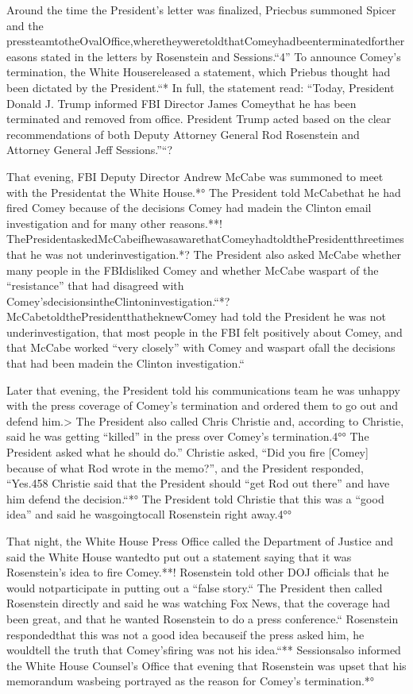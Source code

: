 {Around the time the President’s letter was finalized, Priecbus summoned Spicer and the pressteamtotheOvalOffice,wheretheyweretoldthatComeyhadbeenterminatedforthereasons stated in the letters by Rosenstein and Sessions.“4” To announce Comey’s termination, the White Housereleased a statement, which Priebus thought had been dictated by the President.“* In full, the statement read: “Today, President Donald J. Trump informed FBI Director James Comeythat he has been terminated and removed from office. President Trump acted based on the clear recommendations of both Deputy Attorney General Rod Rosenstein and Attorney General Jeff Sessions.”“?

That evening, FBI Deputy Director Andrew McCabe was summoned to meet with the Presidentat the White House.*° The President told McCabethat he had fired Comey because of the decisions Comey had madein the Clinton email investigation and for many other reasons.**! ThePresidentaskedMcCabeifhewasawarethatComeyhadtoldthePresidentthreetimesthat he was not underinvestigation.*? The President also asked McCabe whether many people in the FBIdisliked Comey and whether McCabe waspart of the “resistance” that had disagreed with Comey’sdecisionsintheClintoninvestigation.“*? McCabetoldthePresidentthatheknewComey had told the President he was not underinvestigation, that most people in the FBI felt positively about Comey, and that McCabe worked “very closely” with Comey and waspart ofall the decisions that had been madein the Clinton investigation.“

Later that evening, the President told his communications team he was unhappy with the press coverage of Comey’s termination and ordered them to go out and defend him.> The President also called Chris Christie and, according to Christie, said he was getting “killed” in the press over Comey’s termination.4°° The President asked what he should do.” Christie asked, “Did you fire [Comey] because of what Rod wrote in the memo?”, and the President responded, “Yes.458 Christie said that the President should “get Rod out there” and have him defend the decision.“*° The President told Christie that this was a “good idea” and said he wasgoingtocall Rosenstein right away.4°°

That night, the White House Press Office called the Department of Justice and said the White House wantedto put out a statement saying that it was Rosenstein’s idea to fire Comey.**! Rosenstein told other DOJ officials that he would notparticipate in putting out a “false story.“ The President then called Rosenstein directly and said he was watching Fox News, that the coverage had been great, and that he wanted Rosenstein to do a press conference.“ Rosenstein respondedthat this was not a good idea becauseif the press asked him, he wouldtell the truth that Comey’sfiring was not his idea.“** Sessionsalso informed the White House Counsel’s Office that evening that Rosenstein was upset that his memorandum wasbeing portrayed as the reason for Comey’s termination.*°

}
